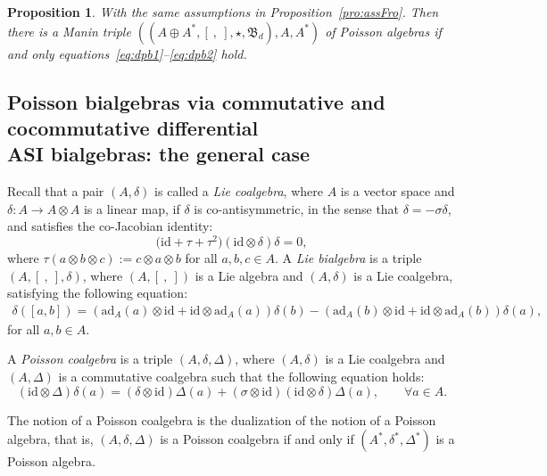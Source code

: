 \documentclass[10pt,a4paper]{amsart}
\numberwithin{equation}{section}
\newtheorem{Proposition}[Theorem]{Proposition}
{ \theoremstyle{definition}
	\newtheorem{Definition}[Theorem]{Definition}
	\newtheorem{Note}[Theorem]{Note}
	\newtheorem{Example}[Theorem]{Example}
	\newtheorem{Remark}[Theorem]{Remark} }
\newcommand{\ad}{\mathrm{ad}}
\newcommand{\id}{\mathrm{id}}
\begin{document}
\begin{Proposition}\label{pro:gmtf}
 With the same assumptions in Proposition~{\rm \ref{pro:assFro}}.
 Then there is a Manin triple $((A \oplus A^*,[\ ,\ ], \star, \mathfrak{B}_d), A, A^*)$ of Poisson algebras if and only equations~\eqref{eq:dpb1}--\eqref{eq:dpb2} hold.
\end{Proposition}

\subsection[Poisson bialgebras via commutative and cocommutative differential ASI bialgebras: the general case]{Poisson bialgebras via commutative and cocommutative differential\\ ASI bialgebras: the general case}

Recall that a pair $(A, \delta)$ is called a \textit{Lie
coalgebra}, where $A$ is a vector space and $\delta\colon A \to A
\otimes A$ is a linear map, if $\delta$ is
co-antisymmetric, in the sense that $\delta = -\sigma \delta$, and
satisfies the co-Jacobian identity:
\begin{equation*}
 \big(\id + \tau + \tau^2\big)(\id \otimes \delta)\delta = 0,
\end{equation*}
where $\tau(a \otimes b \otimes c):= c \otimes a \otimes b$ for all $a, b, c \in A$.
A \textit{Lie bialgebra} is a triple $(A, [\ ,\ ], \delta)$,
where $(A, [\ ,\ ])$ is a Lie algebra and $(A, \delta)$ is a Lie coalgebra,
satisfying the following equation:
\begin{gather}
 \delta([a, b]) = (\ad_A(a) \otimes \id + \id \otimes \ad_A (a) )\delta(b) - (\ad_A (b) \otimes \id + \id \otimes \ad_A (b) )\delta(a),
\label{eq:lie_bi}
\end{gather}
for all $a, b \in A$.

\begin{Definition}
 A \textit{Poisson coalgebra} is a triple $(A, \delta, \Delta)$,
 where $(A, \delta)$ is a Lie coalgebra and $(A, \Delta)$ is a commutative coalgebra
 such that the following equation holds:
 \begin{equation*}
 (\id \otimes \Delta)\delta(a) = (\delta \otimes \id)\Delta(a) + (\sigma \otimes \id)(\id \otimes \delta)\Delta(a), \qquad \forall a \in A. %
 \end{equation*}
\end{Definition}
\begin{Remark}
 The notion of a Poisson coalgebra is the dualization of the notion of a Poisson algebra, that is, $(A, \delta, \Delta)$ is a Poisson coalgebra if and only if $(A^*, \delta^*, \Delta^*)$ is a Poisson algebra.
\end{Remark}
\end{document}
